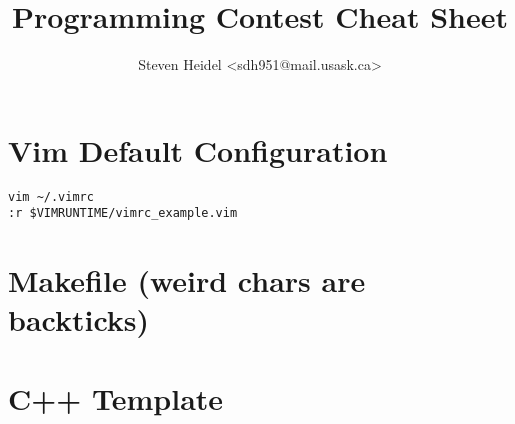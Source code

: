 \documentclass{article}
\begin{document}
\title{Programming Contest Cheat Sheet}
\author{Steven Heidel \textless sdh951@mail.usask.ca\textgreater}
\date{}

\maketitle

\section{Vim Default Configuration}

\begin{lstlisting}
vim ~/.vimrc
:r $VIMRUNTIME/vimrc_example.vim
\end{lstlisting}

\section{Makefile (weird chars are backticks)}



\section{C++ Template}


\end{document}
